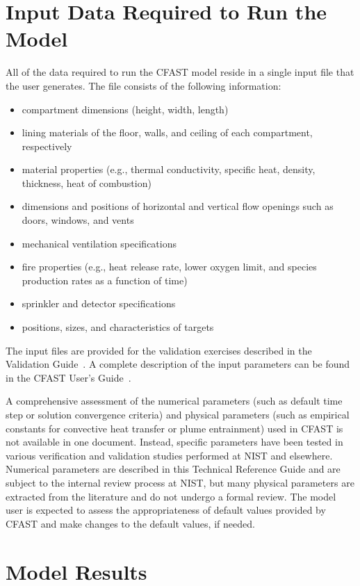 \documentclass[12pt]{book}
\begin{document}
\section{Input Data Required to Run the Model}

All of the data required to run the CFAST model reside in a single input file that the user generates. The file consists of the following information:
\begin{itemize}
\item compartment dimensions (height, width, length)
\item lining materials of the floor, walls, and ceiling of each compartment, respectively
\item material properties (e.g., thermal conductivity, specific heat, density, thickness, heat of combustion)
\item dimensions and positions of horizontal and vertical flow openings such as doors, windows, and vents
\item mechanical ventilation specifications
\item fire properties (e.g., heat release rate, lower oxygen limit, and species production rates as a function of time)
\item sprinkler and detector specifications
\item positions, sizes, and characteristics of targets
\end{itemize}
The input files are provided for the validation exercises described in the Validation Guide~\cite{CFAST_Valid_Guide_7}. A complete description of the input parameters can be found in the CFAST User's Guide~\cite{CFAST_Users_Guide_7}.

A comprehensive assessment of the numerical parameters (such as default time step or solution convergence criteria) and physical parameters (such as empirical constants for convective heat transfer or plume entrainment) used in CFAST is not available in one document. Instead, specific parameters have been tested in various verification and validation studies performed at NIST and elsewhere. Numerical parameters are described in this Technical Reference Guide and are subject to the internal review process at NIST, but many physical parameters are extracted from the literature and do not undergo a formal review. The model user is expected to assess the appropriateness of default values provided by CFAST and make changes to the default values, if needed.



\section{Model Results}
\end{document}
